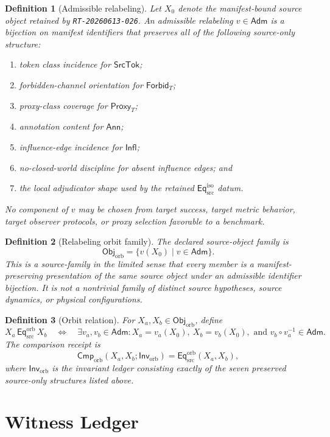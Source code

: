 \documentclass[11pt]{article}
\newcommand{\ObjOrb}{\mathsf{Obj}_{\mathrm{orb}}}
\newcommand{\Adm}{\mathsf{Adm}}
\newcommand{\InvOrb}{\mathsf{Inv}_{\mathrm{orb}}}
\newcommand{\CmpOrb}{\mathsf{Cmp}_{\mathrm{orb}}}
\newcommand{\EqOrb}{\mathsf{Eq}_{\mathrm{src}}^{\mathrm{orb}}}
\newcommand{\EqIso}{\mathsf{Eq}_{\mathrm{src}}^{\mathrm{iso}}}
\newcommand{\SrcTok}{\mathsf{SrcTok}}
\newcommand{\Forbid}{\mathsf{Forbid}_{T}}
\newcommand{\Proxy}{\mathsf{Proxy}_{T}}
\newcommand{\Annot}{\mathsf{Ann}}
\newcommand{\Influence}{\mathsf{Infl}}
\newtheorem{definitionblock}{Definition}
\begin{document}
\begin{definitionblock}[Admissible relabeling]
Let \(X_{0}\) denote the manifest-bound source object retained by
\texttt{RT-20260613-026}. An admissible relabeling \(v\in\Adm\) is a
bijection on manifest identifiers that preserves all of the following
source-only structure:
\begin{enumerate}
    \item token class incidence for \(\SrcTok\);
    \item forbidden-channel orientation for \(\Forbid\);
    \item proxy-class coverage for \(\Proxy\);
    \item annotation content for \(\Annot\);
    \item influence-edge incidence for \(\Influence\);
    \item no-closed-world discipline for absent influence edges; and
    \item the local adjudicator shape used by the retained
    \(\EqIso\) datum.
\end{enumerate}
No component of \(v\) may be chosen from target success, target metric
behavior, target observer protocols, or proxy selection favorable to a
benchmark.
\end{definitionblock}

\begin{definitionblock}[Relabeling orbit family]
The declared source-object family is
\[
    \ObjOrb=\{v(X_{0})\mid v\in\Adm\}.
\]
This is a source-family in the limited sense that every member is a
manifest-preserving presentation of the same source object under an
admissible identifier bijection. It is not a nontrivial family of distinct
source hypotheses, source dynamics, or physical configurations.
\end{definitionblock}

\begin{definitionblock}[Orbit relation]
For \(X_{a},X_{b}\in\ObjOrb\), define
\[
    X_{a}\,\EqOrb\,X_{b}
    \quad\Longleftrightarrow\quad
    \exists v_{a},v_{b}\in\Adm:
    X_{a}=v_{a}(X_{0}),\ X_{b}=v_{b}(X_{0}),
    \text{ and } v_{b}\circ v_{a}^{-1}\in\Adm .
\]
The comparison receipt is
\[
    \CmpOrb(X_{a},X_{b};\InvOrb)=\EqOrb(X_{a},X_{b}),
\]
where \(\InvOrb\) is the invariant ledger consisting exactly of the seven
preserved source-only structures listed above.
\end{definitionblock}

\section{Witness Ledger}
\end{document}
